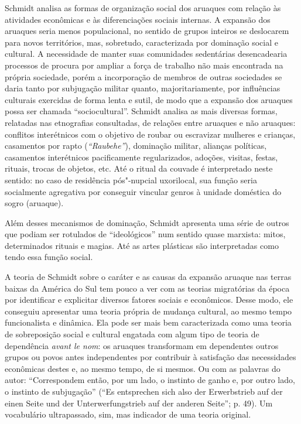 Schmidt analisa as formas de organização social dos aruaques com
relação às atividades econômicas e às diferenciações sociais internas. A
expansão dos aruaques seria menos populacional, no sentido de grupos
inteiros se deslocarem para novos territórios, mas, sobretudo,
caracterizada por dominação social e cultural. A necessidade de manter
suas comunidades sedentárias desencadearia processos de procura por
ampliar a força de trabalho não mais encontrada na própria sociedade,
porém a incorporação de membros de outras sociedades se daria tanto por
subjugação militar quanto, majoritariamente, por influências culturais
exercidas de forma lenta e sutil, de modo que a expansão dos aruaques
possa ser chamada ``sociocultural''. Schmidt analisa as mais diversas
formas, relatadas nas etnografias consultadas, de relações entre
aruaques e não aruaques: conflitos interétnicos com o objetivo de roubar
ou escravizar mulheres e crianças, casamentos por rapto
(\emph{``Raubehe''}), dominação militar, alianças políticas, casamentos
interétnicos pacificamente regularizados, adoções, visitas, festas,
rituais, trocas de objetos, etc. Até o ritual da couvade é interpretado
neste sentido: no caso de residência pós"-nupcial uxorilocal, sua função
seria socialmente agregativa por conseguir vincular genros à unidade
doméstica do sogro (aruaque).

Além desses mecanismos de dominação, Schmidt apresenta uma série de
outros que podiam ser rotulados de ``ideológicos'' num sentido quase
marxista: mitos, determinados rituais e magias. Até as artes plásticas
são interpretadas como tendo essa função social.

A teoria de Schmidt sobre o caráter e as causas da expansão aruaque nas
terras baixas da América do Sul tem pouco a ver com as teorias
migratórias da época por identificar e explicitar diversos fatores
sociais e econômicos. Desse modo, ele conseguiu apresentar uma teoria
própria de mudança cultural, ao mesmo tempo funcionalista e dinâmica.
Ela pode ser mais bem caracterizada como uma teoria de sobreposição
social e cultural engatada com algum tipo de teoria de dependência
\emph{avant le nom}: os aruaques transformam em dependentes outros
grupos ou povos antes independentes por contribuir à satisfação das
necessidades econômicas destes e, ao mesmo tempo, de si mesmos. Ou com
as palavras do autor: ``Correspondem então, por um lado, o instinto de
ganho e, por outro lado, o instinto de subjugação'' (``Es entsprechen
sich also der Erwerbstrieb auf der einen Seite und der
Unterwerfungstrieb auf der anderen Seite''; p. 49). Um vocabulário
ultrapassado, sim, mas indicador de uma teoria original.

